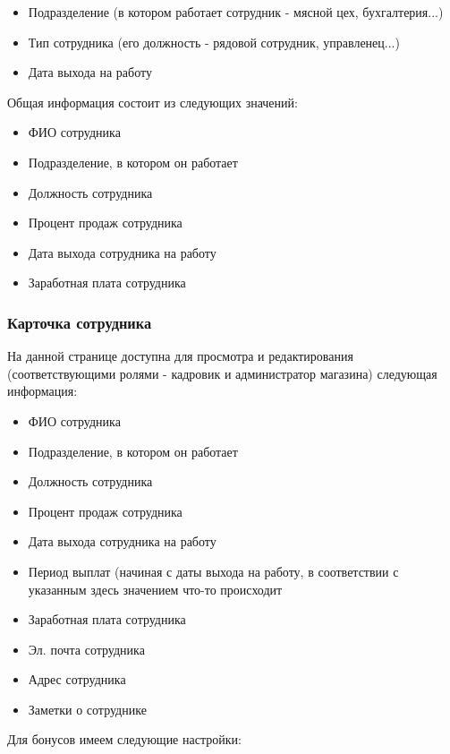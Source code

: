 \documentclass[DIV=calc, paper=a4, fontsize=11pt]{scrartcl} %
\begin{document}
\begin{itemize}
	\item Подразделение (в котором работает сотрудник - мясной цех, бухгалтерия...)
	\item Тип сотрудника (его должность - рядовой сотрудник, управленец...)
	\item Дата выхода на работу
\end{itemize}

Общая информация состоит из следующих значений:

\begin{itemize}
	\item ФИО сотрудника
	\item Подразделение, в котором он работает 
	\item Должность сотрудника
	\item Процент продаж сотрудника
	\item Дата выхода сотрудника на работу
	\item Заработная плата сотрудника
\end{itemize}

\subsubsection{Карточка сотрудника}

На данной странице доступна для просмотра и редактирования (соответствующими ролями - кадровик и администратор магазина) следующая информация:

\begin{itemize}
	\item ФИО сотрудника
	\item Подразделение, в котором он работает 
	\item Должность сотрудника
	\item Процент продаж сотрудника
	\item Дата выхода сотрудника на работу
	\item Период выплат (начиная с даты выхода на работу, в соответствии с указанным здесь значением что-то происходит 
	\item Заработная плата сотрудника
	\item Эл. почта сотрудника
	\item Адрес сотрудника
	\item Заметки о сотруднике
\end{itemize}

Для бонусов имеем следующие настройки:
\end{document}

